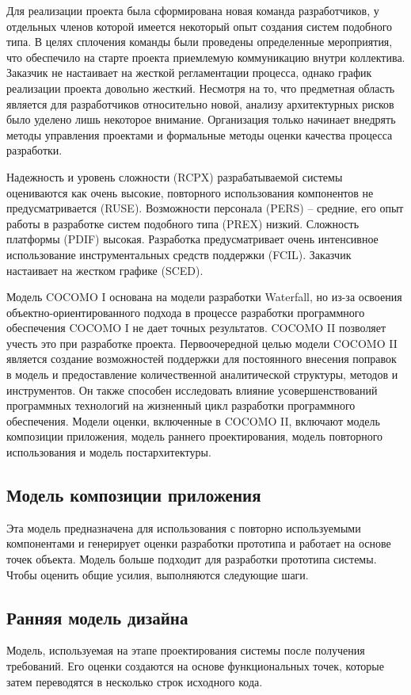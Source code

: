 Для реализации проекта была сформирована новая команда разработчиков, у отдельных членов которой имеется некоторый опыт создания систем подобного типа. 
В целях сплочения команды были проведены определенные мероприятия, что обеспечило на старте проекта приемлемую коммуникацию внутри коллектива. 
Заказчик не настаивает на жесткой регламентации процесса, однако график реализации проекта довольно жесткий. 
Несмотря на то, что предметная область является для разработчиков относительно новой, анализу архитектурных рисков было уделено лишь некоторое внимание. 
Организация только начинает внедрять методы управления проектами и формальные методы оценки качества процесса разработки.

Надежность и уровень сложности (RCPX) разрабатываемой системы оцениваются как очень высокие, повторного использования компонентов не
предусматривается (RUSE). 
Возможности персонала (PERS) – средние, его  опыт работы в разработке систем подобного типа (PREX) низкий. 
Сложность платформы (PDIF) высокая. 
Разработка предусматривает очень интенсивное использование инструментальных средств поддержки (FCIL). 
Заказчик настаивает на жестком графике (SCED).

Модель COCOMO I основана на модели разработки Waterfall, но из-за освоения объектно-ориентированного подхода в процессе разработки программного обеспечения COCOMO I не дает точных результатов. 
COCOMO II позволяет учесть это при разработке проекта.
Первоочередной целью модели COCOMO II является создание возможностей поддержки для постоянного внесения поправок в модель и предоставление количественной аналитической структуры, методов и инструментов. 
Он также способен исследовать влияние усовершенствований программных технологий на жизненный цикл разработки программного обеспечения.
Модели оценки, включенные в COCOMO II, включают модель композиции приложения, модель раннего проектирования, модель повторного
использования и модель постархитектуры.

\subsection*{Модель композиции приложения}
Эта модель предназначена для использования с повторно используемыми компонентами и генерирует оценки разработки прототипа и работает на основе точек объекта.
Модель больше подходит для разработки прототипа системы. 
Чтобы оценить общие усилия, выполняются следующие шаги.

\subsection*{Ранняя модель дизайна}
Модель, используемая на этапе проектирования системы после получения требований. 
Его оценки создаются на основе функциональных точек, которые затем переводятся в несколько строк исходного кода. 

